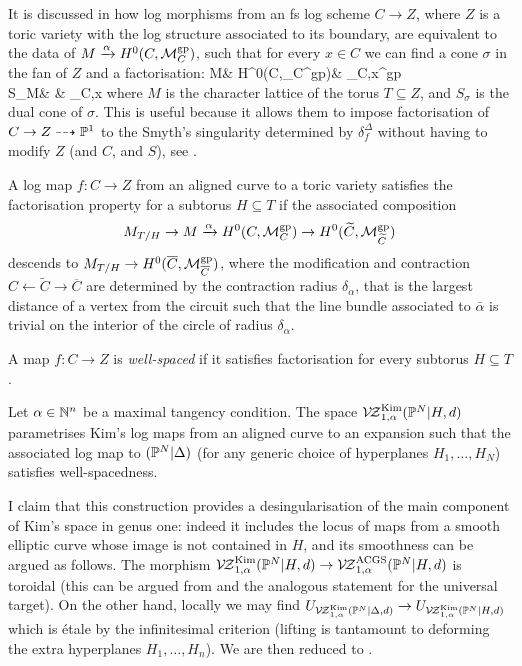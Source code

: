 It is discussed in \cite[Proposition 2.4.2.1]{RSPW2} how log morphisms from an fs log scheme $C\to Z$, where $Z$ is a toric variety with the log structure associated to its boundary, are equivalent to the data of $M\xrightarrow{\alpha} H^0(C,\mathcal M_C^{\rm{gp}})$, such that for every $x\in C$ we can find a cone $\sigma$ in the fan of $Z$ and a factorisation:
\bcd
M\ar[r] & H^0(C,\pM_C^{\rm{gp}})\ar[r] & \overline{\pM}_{C,x}^{\rm{gp}} \\
S_\sigma\cap M\ar[u,hook]\ar[rr,dashed] & & \overline{\pM}_{C,x}\ar[u,hook]
\ecd
where $M$ is the character lattice of the torus $T\subseteq Z$, and $S_\sigma$ is the dual cone of $\sigma$. This is useful because it allows them to impose factorisation of $C\rightarrow Z\dashrightarrow \mathbb P^1$ to the Smyth's singularity determined by $\delta_f^\Delta$ without having to modify $Z$ (and $C$, and $S$), see \cite[Definition 3.3.3]{RSPW2}.
\begin{dfn}
 A log map $f\colon C\to Z$ from an aligned curve to a toric variety satisfies the factorisation property for a subtorus $H\subseteq T$ if the associated composition \[M_{T/H}\rightarrow M\xrightarrow{\alpha} H^0(C,{\mathcal M}_C^{\rm{gp}})\rightarrow H^0(\widetilde{C},\mathcal M_{\widetilde{C}}^{\rm{gp}})\] descends to $M_{T/H}\rightarrow H^0(\overline{C},\mathcal M_{\overline{C}}^{\rm{gp}})$, where the modification and contraction $C\leftarrow \widetilde{C}\to \overline{C}$ are determined by the contraction radius $\delta_{\alpha}$, that is the largest distance of a vertex from the circuit such that the line bundle associated to $\bar\alpha$ is trivial on the interior of the circle of radius $\delta_\alpha$.
 
 A map $f\colon C\to Z$ is \emph{well-spaced} if it satisfies factorisation for every subtorus $H\subseteq T$.
\end{dfn}

\begin{dfn}
 Let $\alpha\in\mathbb{N}^n$ be a maximal tangency condition. The space $\mathcal{V\!Z}^{\rm{Kim}}_{1,\alpha}(\mathbb P^N|H,d)$ parametrises Kim's log maps from an aligned curve to an expansion such that the associated log map to $(\mathbb P^N|\Delta)$ (for any generic choice of hyperplanes $H_1,\ldots,H_N$) satisfies well-spacedness.
\end{dfn}

I claim that this construction provides a desingularisation of the main component of Kim's space in genus one: indeed it includes the locus of maps from a smooth elliptic curve whose image is not contained in $H$, and its smoothness can be argued as follows. The morphism $\mathcal{V\!Z}^{\rm{Kim}}_{1,\alpha}(\mathbb P^N|H,d)\rightarrow \mathcal{V\!Z}^{\rm{ACGS}}_{1,\alpha}(\mathbb P^N|H,d)$ is toroidal (this can be argued from \cite[Lemma A and \S 4.3]{AbramovichMarcusWiseComparison} and the analogous statement for the universal target). On the other hand, locally we may find $U_{\mathcal{V\!Z}^{\rm{Kim}}_{1,\alpha}(\mathbb P^N|\Delta,d)}\rightarrow U_{\mathcal{V\!Z}^{\rm{Kim}}_{1,\alpha}(\mathbb P^N|H,d)}$ which is \'etale by the infinitesimal criterion (lifting is tantamount to deforming the extra hyperplanes $H_1,\ldots,H_n$). We are then reduced to \cite[Theorem 3.5.1]{RSPW2}.

